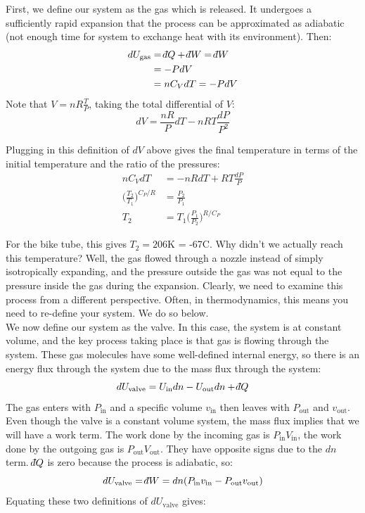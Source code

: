 \documentclass[12pt]{article}
\def\dbar{{\mathchar'26\mkern-12mu d}}
\begin{document}
First, we define our system as the gas which is released. It undergoes a sufficiently rapid expansion that the process can be approximated as adiabatic (not enough time for system to exchange heat with its environment). Then:
\begin{align*}
dU_\text{gas} &= \dbar Q + \dbar W = \dbar W \\
&= -P dV\\
&= n C_V dT = -P dV
\end{align*}
Note that $V = nR\frac{T}{P}$, taking the total differential of $V$:
$$
dV = \frac{n R}{P} dT - nRT \frac{dP}{P^2}
$$


Plugging in this definition of $dV$ above gives the final temperature in terms of the initial temperature and the ratio of the pressures:
\begin{align*}
nC_V dT &= -nRdT + RT \frac{dP}{P}\\
\Big(\frac{T_2}{T_1}\Big)^{C_P/ R} &= \frac{P_2}{P_1}\\
T_2 &= T_1 \Big(\frac{P_1}{P_2}\Big)^{R/C_P}
\end{align*}

For the bike tube, this gives $T_2 = 206$K = -67\degree C.  Why didn't we actually reach this temperature?  Well, the gas flowed through a nozzle instead of simply isotropically expanding, and the pressure outside the gas was not equal to the pressure inside the gas during the expansion. Clearly, we need to examine this process from a different perspective. Often, in thermodynamics, this means you need to re-define your system. We do so below.\\

We now define our system as the valve. In this case, the system is at constant volume, and the key process taking place is that gas is flowing through the system. These gas molecules have some well-defined internal energy, so there is an energy flux through the system due to the mass flux through the system:
\begin{equation}
dU_\text{valve} = U_\text{in} d n - U_\text{out} d n + \dbar Q
\end{equation}
The gas enters with $P_\text{in}$ and a specific volume $v_\text{in}$ then leaves with $P_\text{out}$ and $v_\text{out}$.  Even though the valve is a constant volume system, the mass flux implies that we will have a work term. The work done by the incoming gas is $P_\text{in} V_\text{in}$, the work done by the outgoing gas is $P_\text{out} V_\text{out}$. They have opposite signs due to the $dn$ term. $\dbar Q$ is zero because the process is adiabatic, so:
\begin{equation}
dU_\text{valve} = \dbar W = d n (P_\text{in} v_\text{in} - P_\text{out} v_\text{out})
\end{equation}
Equating these two definitions of $dU_\text{valve}$ gives:
\end{document}
